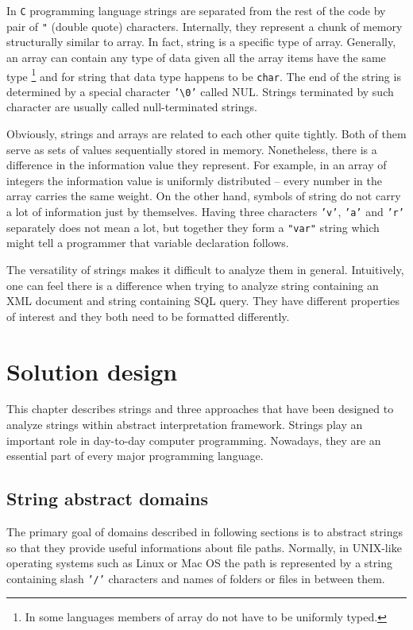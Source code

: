 \documentclass[12pt,final,oneside]{fithesis2}
\theoremstyle{definition}
\begin{document}
In \texttt{C} programming language strings are separated from the rest of
the code by pair of \texttt{"} (double quote) characters. Internally,
they represent a chunk of memory structurally similar to array. In fact,
string is a specific type of array. Generally, an array can contain any
type of data given all the array items have the same type \footnote{In some
languages members of array do not have to be uniformly typed.} and for
string that data type happens to be \texttt{char}. The end of the string is
determined by a special character \texttt{'\textbackslash0'} called NUL.
Strings terminated by such character are usually called null-terminated
strings.

Obviously, strings and arrays are related to each other quite tightly.
Both of them serve as sets of values sequentially stored in memory.
Nonetheless, there is a difference in the information value they represent.
For example, in an array of integers the information value is uniformly
distributed -- every number in the array carries the same weight. On the
other hand, symbols of string do not carry a lot of information just by
themselves. Having three characters \texttt{'v'}, \texttt{'a'} and
\texttt{'r'} separately does not mean a lot, but together they form
a \texttt{"var"} string which might tell a programmer that variable
declaration follows.

The versatility of strings makes it difficult to analyze them in general.
Intuitively, one can feel there is a difference when trying to analyze
string containing an XML document and string containing SQL query. They
have different properties of interest and they both need to be formatted
differently.


\chapter{Solution design}
\label{chap:design}

This chapter describes strings and three approaches that have been designed
to analyze strings within abstract interpretation framework. Strings play
an important role in day-to-day computer programming. Nowadays, they are
an essential part of every major programming language.


\section{String abstract domains}

The primary goal of domains described in following sections is to
abstract strings so that they provide useful informations about file
paths. Normally, in UNIX-like operating systems such as Linux or Mac OS
the path is represented by a string containing slash \texttt{'/'} characters
and names of folders or files in between them.
\end{document}
